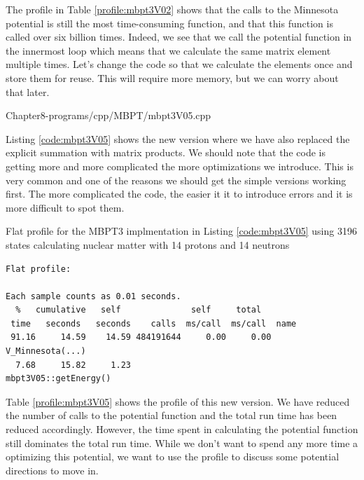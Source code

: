     The profile in Table \ref{profile:mbpt3V02} shows that the calls to the Minnesota potential
    is still the most time-consuming function, and that this
    function is called over six billion times. Indeed, we see that we call the potential
    function in the innermost loop which means that we calculate the same matrix
    element multiple times. Let's change the code so that we calculate the
    elements once and store them for reuse. This will require more memory, but
    we can worry about that later.
    

{Chapter8-programs/cpp/MBPT/mbpt3V05.cpp}

Listing \ref{code:mbpt3V05}  shows the new version where we
have also replaced the explicit summation with matrix products. We should note
that the code is getting more and more complicated the more optimizations we
introduce. This is very common and one of the reasons we should get the simple
versions working first. The more complicated the code, the easier it it to
introduce errors and it is more difficult to spot them.
    
\begin{table}[h]
\caption{Flat profile for the MBPT3 implmentation in Listing \ref{code:mbpt3V05}
using 3196 states calculating nuclear matter with 14 protons and 14 neutrons}\label{profile:mbpt3V05}
\begin{verbatim}
Flat profile:

Each sample counts as 0.01 seconds.
  %   cumulative   self              self     total           
 time   seconds   seconds    calls  ms/call  ms/call  name    
 91.16     14.59    14.59 484191644     0.00     0.00  V_Minnesota(...)
  7.68     15.82     1.23                             mbpt3V05::getEnergy()
\end{verbatim}
\end{table}

    Table \ref{profile:mbpt3V05}
    shows the profile of this new version. We have reduced the number of calls to the potential
    function and the total run time has been reduced accordingly.  However, the
    time spent in calculating the potential function still dominates the total
    run time. While we don't want to spend any more time a optimizing this
    potential, we want to use the profile to discuss some potential directions
    to move in. 

